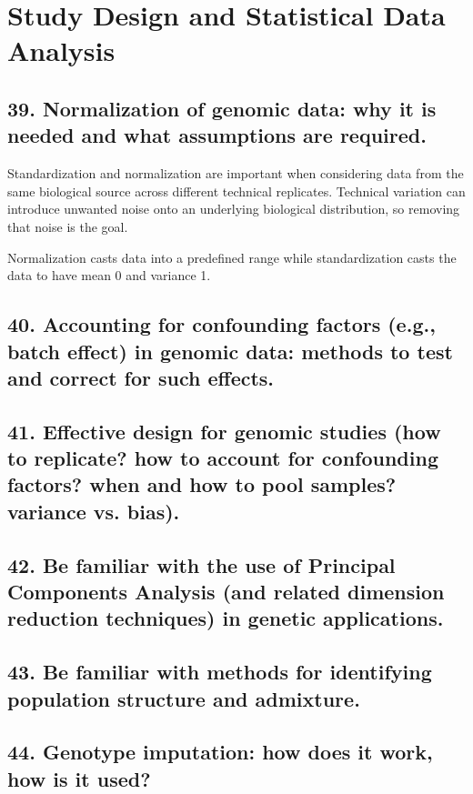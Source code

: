 \documentclass{tufte-handout}
\theoremstyle{noparens}
\begin{document}
\newpage
\section{Study Design and Statistical Data Analysis}\label{sec:stats}

\subsection{39. Normalization of genomic data: why it is needed and what assumptions are required.}

Standardization and normalization are important when considering data from the same biological source across different technical replicates. Technical variation can introduce unwanted noise onto an underlying biological distribution, so removing that noise is the goal.

Normalization casts data into a predefined range while standardization casts the data to have mean 0 and variance 1.

\newpage
\subsection{40. Accounting for confounding factors (e.g., batch effect) in genomic data: methods to test and correct for such effects.}

\newpage
\subsection{41. Effective design for genomic studies (how to replicate? how to account for confounding factors? when and how to pool samples? variance vs. bias).}

\newpage
\subsection{42. Be familiar with the use of Principal Components Analysis (and related dimension reduction techniques) in genetic applications.}

\newpage
\subsection{43. Be familiar with methods for identifying population structure and admixture.}

\newpage
\subsection{44. Genotype imputation: how does it work, how is it used?}
\end{document}
